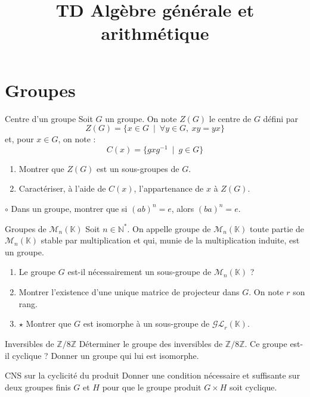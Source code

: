 \documentclass[french,a4paper]{article}
\title{TD Algèbre générale et arithmétique}
\newcommand{\N}{\mathbb{N}}
\newcommand{\Z}{\mathbb{Z}}
\newcommand{\K}{\mathbb{K}}
\newcommand{\st}{^*}
\newcommand{\inv}{^{-1}}
\theoremstyle{plain}
\theoremstyle{definition}
\theoremstyle{remark}
\begin{document}
\maketitle

\section{Groupes}

\begin{ex}[Moulin.01]{Centre d'un groupe}
	Soit $G$ un groupe. On note $Z(G)$ le centre de $G$ défini par $$Z(G)=\{x\in G\ \mid \ \forall y\in G,\ xy=yx\}$$ et, pour $x\in G$, on note : $$C(x)=\{gxg\inv\ \mid\ g\in G\}$$
	\begin{enumerate}
		\item Montrer que $Z(G)$ est un sous-groupes de $G$.
		\item Caractériser, à l'aide de $C(x)$, l'appartenance de $x$ à $Z(G)$.
	\end{enumerate}
\end{ex}

\begin{ex}[Moulin.02]{$\circ$}
	Dans un groupe, montrer que si $(ab)^n=e$, alors $(ba)^n=e$.
\end{ex}

\begin{ex}[Moulin.03]{Groupes de $\mathcal{M}_n(\K)$}
	Soit $n\in\N\st$. On appelle groupe de $\mathcal{M}_n(\K)$ toute partie de $\mathcal{M}_n(\K)$ stable par multiplication et qui, munie de la multiplication induite, est un groupe.
	\begin{enumerate}
		\item Le groupe $G$ est-il nécessairement un sous-groupe de $\mathcal{M}_n(\K)$ ?
		\item Montrer l'existence d'une unique matrice de projecteur dans $G$. On note $r$ son rang.
		\item $\star$ Montrer que $G$ est isomorphe à un sous-groupe de $\mathcal{GL}_r(\K)$.		
	\end{enumerate}
\end{ex}

\begin{ex}[Moulin.04]{Inversibles de $\Z/8\Z$}
	Déterminer le groupe des inversibles de $\Z/8\Z$. Ce groupe est-il cyclique ? Donner un groupe qui lui est isomorphe.
\end{ex}

\begin{ex}[Moulin.05]{CNS sur la cyclicité du produit}
	Donner une condition nécessaire et suffisante sur deux groupes finis $G$ et $H$ pour que le groupe produit $G\times H$ soit cyclique.
\end{ex}
\end{document}

